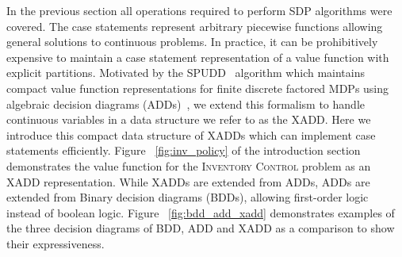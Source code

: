 \documentclass[twoside,11pt]{article}
\newcommand{\InventoryControl}{\textsc{Inventory Control }}
\begin{document}
In the previous section all operations required to perform SDP algorithms were covered. The case statements represent arbitrary piecewise functions allowing general solutions to continuous problems. In practice, it can be prohibitively expensive to maintain
a case statement representation of a value function with explicit
partitions.  Motivated by the SPUDD~\cite{spudd} algorithm which
maintains compact value function representations for finite discrete
factored MDPs using algebraic decision diagrams (ADDs)~\cite{bahar93add},
we extend this formalism to handle continuous variables in a data
structure we refer to as the XADD. Here we introduce this compact data structure of XADDs which can implement case statements efficiently. Figure ~\ref{fig:inv_policy} of the introduction section demonstrates the value function for the \InventoryControl problem as an XADD representation. While XADDs are extended from ADDs, ADDs are extended from Binary decision diagrams (BDDs), allowing first-order logic instead of boolean logic. Figure ~\ref{fig:bdd_add_xadd} demonstrates examples of the three decision diagrams of BDD, ADD and XADD as a comparison to show their expressiveness.   
\end{document}
